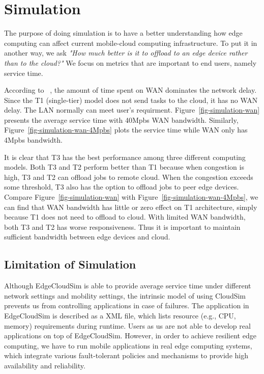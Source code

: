 \section{Simulation}
\label{sec:simulation}



The purpose of doing simulation is to have a better understanding how edge computing can
affect current mobile-cloud computing infrastructure. To put it in another way,
we ask {\em "How much better is it to offload to an edge device rather than to the cloud?"}
We focus on metrics that are important to end users, namely service time.

According to ~\cite{edgecloudsim}, the amount of time spent on WAN dominates the network delay.
Since the T1 (single-tier) model does not send tasks to the cloud, it has no WAN delay. The LAN
normally can meet user's requirment.
Figure~\ref{fig-simulation-wan} presents the average service time with 40Mpbs WAN bandwidth.
Similarly, Figure~\ref{fig-simulation-wan-4Mpbs} plots the service time while WAN only has 4Mpbs bandwidth.

It is clear that T3 has the best performance among three different computing models. Both T3 and T2 perform better
than T1 because when congestion is high, T3 and T2 can offload jobs to remote cloud. When the congestion
exceeds some threshold, T3 also has the option to offload jobs to peer edge devices.
Compare Figure~\ref{fig-simulation-wan} with Figure~\ref{fig-simulation-wan-4Mpbs}, we can find
that WAN bandwidth has little or zero effect on T1 architecture, simply because T1 does not need to offload to cloud.
With limited WAN bandwidth, both T3 and T2 has worse responsiveness. Thus it is important to maintain sufficient
bandwidth between edge devices and cloud.

\subsection{Limitation of Simulation}
Although EdgeCloudSim is able to provide average service time under different network settings and mobility settings,
the intrinsic model of using CloudSim prevents us from controlling applications in case of failures. The application
in EdgeCloudSim is described as a XML file, which lists resource (e.g., CPU, memory) requirements during runtime.
Users as us are not able to develop real applications on top of EdgeCloudSim. However, in order to achieve resilient
edge computing, we have to run mobile applications in real edge computing systems, which integrate various
fault-tolerant policies and mechanisms to provide high availability and reliability.

